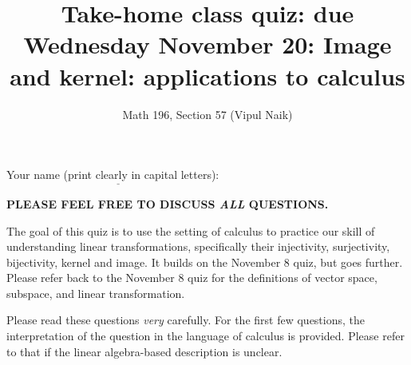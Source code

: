 \documentclass[10pt]{amsart}
\title{Take-home class quiz: due Wednesday November 20: Image and kernel: applications to calculus}
\author{Math 196, Section 57 (Vipul Naik)}
\begin{document}
\maketitle

Your name (print clearly in capital letters): $\underline{\qquad\qquad\qquad\qquad\qquad\qquad\qquad\qquad\qquad\qquad}$

{\bf PLEASE FEEL FREE TO DISCUSS {\em ALL} QUESTIONS.}

The goal of this quiz is to use the setting of calculus to practice
our skill of understanding linear transformations, specifically their
injectivity, surjectivity, bijectivity, kernel and image. It builds on
the November 8 quiz, but goes further. Please refer back to the
November 8 quiz for the definitions of vector space, subspace, and
linear transformation.

Please read these questions {\em very} carefully. For the first few
questions, the interpretation of the question in the language of
calculus is provided. Please refer to that if the linear algebra-based
description is unclear.
\end{document}
